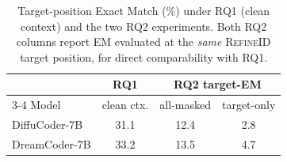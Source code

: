 %
%
%


\begin{table}[t]
  \centering
  \caption{Target-position Exact Match (\%) under RQ1 (clean context) and the
           two RQ2 experiments. Both RQ2 columns report EM evaluated at the
           \emph{same} \textsc{RefineID} target position, for direct
           comparability with RQ1.}
  \label{tab:rq2_em}
  \small
  \setlength{\tabcolsep}{6pt}
  \renewcommand{\arraystretch}{1.05}
  \begin{tabular}{@{}lccc@{}}
    \toprule
                  & RQ1            & \multicolumn{2}{c}{RQ2 target-EM} \\
    \cmidrule(l){3-4}
    Model         & clean ctx.     & all-masked & target-only \\
    \midrule
    DiffuCoder-7B & 31.1           & 12.4       & 2.8 \\
    DreamCoder-7B & 33.2           & 13.5       & 4.7 \\
    \bottomrule
  \end{tabular}
\end{table}


